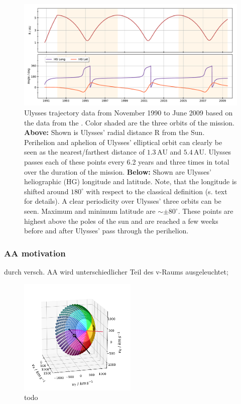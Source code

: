 \begin{figure}[h]
	\includegraphics[width=1\textwidth]{Figures/HG_coord.pdf}
	\centering
	\caption{Ulysses trajectory data from November 1990 to June 2009 based on the data from the \citet{ulysses-data-archive}. Color shaded are the three orbits of the mission. \textbf{Above:} Shown is Ulysses' radial distance R from the Sun. Perihelion and aphelion of Ulysses' elliptical orbit can clearly be seen as the nearest/farthest distance of $1.3\,\mathrm{AU}$ and $5.4\,\mathrm{AU}$. Ulysses passes each of these points every 6.2 years and three times in total over the duration of the mission. \textbf{Below:} Shown are Ulysses' heliographic (HG) longitude and latitude. Note, that the longitude is shifted around $180^\circ$ with respect to the classical definition (s. text for details). A clear periodicity over Ulysses' three orbits can be seen. Maximum and minimum latitude are $\sim \pm 80^\circ$. These points are highest above the poles of the sun and are reached a few weeks before and after Ulysses' pass through the perihelion.}
	\label{fig:traj}
\end{figure}


\subsubsection{AA motivation}
durch versch. AA wird unterschiedlicher Teil des v-Raums ausgeleuchtet;
\begin{figure}[h]
	\includegraphics[width=0.5\textwidth]{Figures/col_aa_marker.png}
	\centering
	\caption{todo}
	\label{todo}
\end{figure}
	

